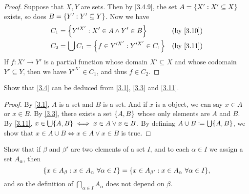 \begin{proof}
  Suppose that \(X, Y\) are sets.
  Then by \cref{3.4.9}, the set \(A = \left\lbrace X' : X' \subseteq X\right\rbrace\) exists, so does \(B = \left\lbrace Y' : Y' \subseteq Y\right\rbrace\).
  Now we have
  \begin{align*}
    C_1 & = \set{Y'^{X'} : X' \in A \land Y' \in B}             &  & \by{3.10} \\
    C_2 & = \bigcup C_1 = \set{f \in Y'^{X'} : Y'^{X'} \in C_1} &  & \by{3.11} \\
  \end{align*}
  If \(f : X' \to Y'\) is a partial function whose domain \(X' \subseteq X\) and whose codomain \(Y' \subseteq Y\), then we have \(Y'^{X'} \in C_1\), and thus \(f \in C_2\).
\end{proof}

\begin{ex}\label{ex:3.4.8}
  Show that \cref{3.4} can be deduced from \cref{3.1}, \cref{3.3} and \cref{3.11}.
\end{ex}

\begin{proof}
  By \cref{3.1}, \(A\) is a set and \(B\) is a set.
  And if \(x\) is a object, we can say \(x \in A\) or \(x \in B\).
  By \cref{3.3}, there exists a set \(\left\lbrace A, B\right\rbrace\) whose only elements are \(A\) and \(B\).
  By \cref{3.11}, \(x \in \bigcup \set{A, B} \iff x \in A \lor x \in B\).
  By defining \(A \cup B \coloneqq \bigcup \set{A, B}\), we show that \(x \in A \cup B \iff x \in A \lor x \in B\) is true.
\end{proof}

\begin{ex}\label{ex:3.4.9}
  Show that if \(\beta\) and \(\beta'\) are two elements of a set \(I\), and to each \(\alpha \in I\) we assign a set \(A_{\alpha}\), then
  \[
    \set{x \in A_{\beta} : x \in A_{\alpha} \ \forall \alpha \in I} = \set{x \in A_{\beta'} : x \in A_{\alpha} \ \forall \alpha \in I},
  \]
  and so the definition of \(\bigcap_{\alpha \in I} A_{\alpha}\) does not depend on \(\beta\).
\end{ex}


